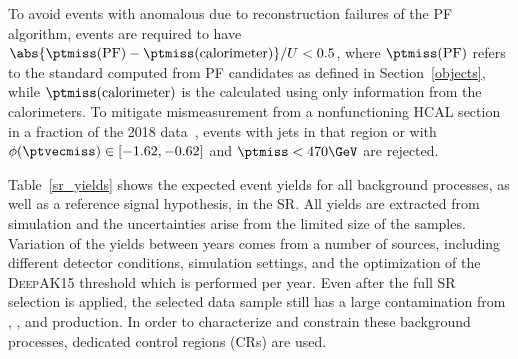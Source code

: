 To avoid events with anomalous \recoil due to reconstruction failures of the PF algorithm, events are required to have $\abs{\ptmiss(\mathrm{PF}) - \ptmiss(\text{calorimeter})}/\recoil < 0.5$, where $\ptmiss(\mathrm{PF})$ refers to the standard \ptmiss computed from PF candidates as defined in Section~\ref{objects}, while $\ptmiss(\text{calorimeter})$ is the \ptmiss calculated using only information from the calorimeters. To mitigate mismeasurement from a nonfunctioning HCAL section in 
a fraction of 
the 2018 data~\cite{CMS:2021far}, events with jets in that region or with $\phi(\ptvecmiss)\in[-1.62,-0.62]$ and $\ptmiss < 470\GeV$ are rejected.

Table~\ref{sr_yields} shows the expected event yields for all background processes, as well as a reference signal hypothesis, in the SR. All yields are extracted from simulation and the uncertainties arise from the limited size of the samples. Variation of the yields between years comes from a number of sources, including different detector conditions, simulation settings, and the optimization of the \textsc{DeepAK15} threshold which is performed per year.
Even after the full SR selection is applied, the selected data sample still has a large contamination from \Zjets, \Wjets, and \ttbar production. In order to characterize and constrain these background processes, dedicated control regions (CRs) are used. 

